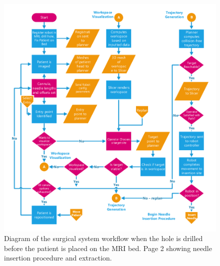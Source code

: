 \documentclass[12pt]{report}
\begin{document}
\begin{figure}[thpb]
	\centering
    \includegraphics[page=2,width=\textwidth]{diagrams/Surgical_Workflow_Hole_Predrilled_V2.pdf}
    \caption{Diagram of the surgical system workflow when the hole is drilled before the patient is placed on the MRI bed. Page 2 showing needle insertion procedure and extraction.}
    \label{fig:surgicalWorkflowPg2}
\end{figure}
\end{document}
